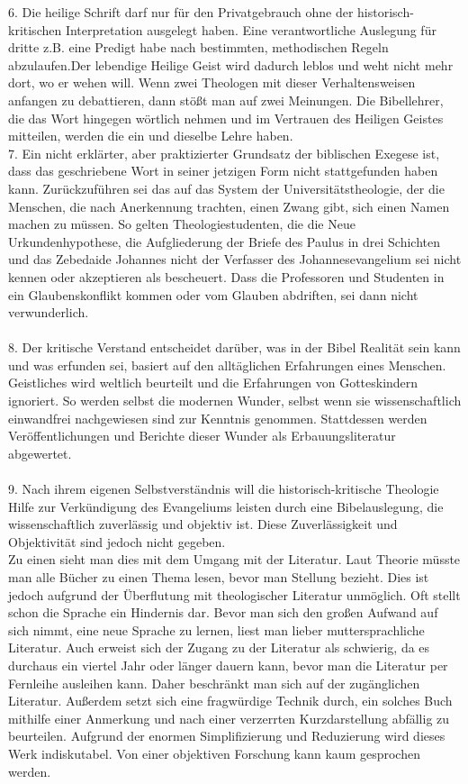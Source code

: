 6. Die heilige Schrift darf nur für den Privatgebrauch ohne der historisch-kritischen Interpretation ausgelegt haben. Eine verantwortliche Auslegung für dritte z.B. eine Predigt habe nach bestimmten, methodischen Regeln abzulaufen.Der lebendige Heilige Geist wird dadurch leblos und weht nicht mehr dort, wo er wehen will. Wenn zwei Theologen mit dieser Verhaltensweisen anfangen zu debattieren, dann stößt man auf zwei Meinungen. Die Bibellehrer, die das Wort hingegen wörtlich nehmen und im Vertrauen des Heiligen Geistes mitteilen, werden die ein und dieselbe Lehre haben. 
\pagebreak
\\
7. Ein nicht erklärter, aber praktizierter Grundsatz der biblischen Exegese ist, dass das geschriebene Wort in seiner jetzigen Form nicht stattgefunden haben kann. Zurückzuführen sei das auf das System der Universitätstheologie, der die Menschen, die nach Anerkennung trachten, einen Zwang gibt, sich einen Namen machen zu müssen. So gelten Theologiestudenten, die die Neue Urkundenhypothese, die Aufgliederung der Briefe des Paulus in drei Schichten und das Zebedaide Johannes nicht der Verfasser des Johannesevangelium sei nicht kennen oder akzeptieren als bescheuert. Dass die Professoren und Studenten in ein Glaubenskonflikt kommen oder vom Glauben abdriften, sei dann nicht verwunderlich.     
\\ ~ \\
8. Der kritische Verstand entscheidet darüber, was in der Bibel Realität sein kann und was erfunden sei, basiert auf den alltäglichen Erfahrungen eines Menschen. Geistliches wird weltlich beurteilt und die Erfahrungen von Gotteskindern ignoriert. So werden selbst die modernen Wunder, selbst wenn sie wissenschaftlich einwandfrei nachgewiesen sind zur Kenntnis genommen. Stattdessen werden Veröffentlichungen und Berichte dieser Wunder als Erbauungsliteratur abgewertet.
\\ ~ \\
9. Nach ihrem eigenen Selbstverständnis will die historisch-kritische Theologie Hilfe zur Verkündigung des Evangeliums leisten durch eine Bibelauslegung, die wissenschaftlich zuverlässig und objektiv ist. Diese Zuverlässigkeit und Objektivität sind jedoch nicht gegeben.
\\
Zu einen sieht man dies mit dem Umgang mit der Literatur. Laut Theorie müsste man alle Bücher zu einen Thema lesen, bevor man Stellung bezieht. Dies ist jedoch aufgrund der Überflutung mit theologischer Literatur unmöglich. Oft stellt schon die Sprache ein Hindernis dar. Bevor man sich den großen Aufwand auf sich nimmt, eine neue Sprache zu lernen, liest man lieber muttersprachliche Literatur. Auch erweist sich der Zugang zu der Literatur als schwierig, da es durchaus ein viertel Jahr oder länger dauern kann, bevor man die Literatur per Fernleihe ausleihen kann. Daher beschränkt man sich auf der zugänglichen Literatur. Außerdem setzt sich eine fragwürdige Technik durch, ein solches Buch mithilfe einer Anmerkung und nach einer verzerrten Kurzdarstellung abfällig zu beurteilen. Aufgrund der enormen Simplifizierung und Reduzierung wird dieses Werk indiskutabel. Von einer objektiven Forschung kann kaum gesprochen werden.
